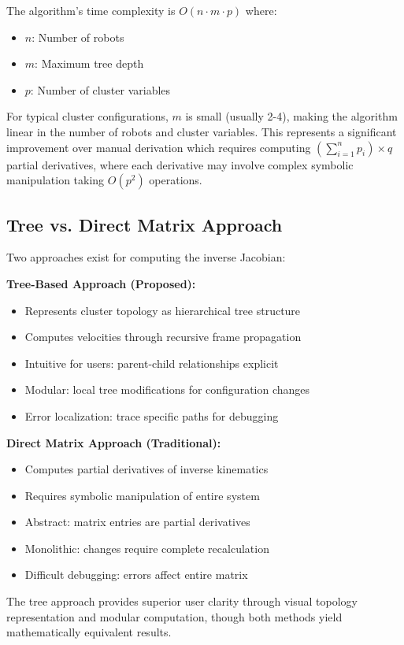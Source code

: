 \documentclass[lettersize,journal]{IEEEtran}
\begin{document}
The algorithm's time complexity is $O(n \cdot m \cdot p)$ where:
\begin{itemize}
\item $n$: Number of robots
\item $m$: Maximum tree depth
\item $p$: Number of cluster variables
\end{itemize}

For typical cluster configurations, $m$ is small (usually 2-4), making the algorithm linear in the number of robots and cluster variables. This represents a significant improvement over manual derivation which requires computing $(\sum_{i=1}^{n} p_i) \times q$ partial derivatives, where each derivative may involve complex symbolic manipulation taking $O(p^2)$ operations.

\subsection{Tree vs. Direct Matrix Approach}

Two approaches exist for computing the inverse Jacobian:

\textbf{Tree-Based Approach (Proposed):}
\begin{itemize}
\item Represents cluster topology as hierarchical tree structure
\item Computes velocities through recursive frame propagation
\item Intuitive for users: parent-child relationships explicit
\item Modular: local tree modifications for configuration changes
\item Error localization: trace specific paths for debugging
\end{itemize}

\textbf{Direct Matrix Approach (Traditional):}
\begin{itemize}
\item Computes partial derivatives of inverse kinematics
\item Requires symbolic manipulation of entire system
\item Abstract: matrix entries are partial derivatives
\item Monolithic: changes require complete recalculation
\item Difficult debugging: errors affect entire matrix
\end{itemize}

The tree approach provides superior user clarity through visual topology representation and modular computation, though both methods yield mathematically equivalent results.
\end{document}
